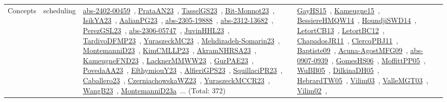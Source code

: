 {\begin{longtable}{lp{3cm}>{\raggedright\arraybackslash}p{6cm}>{\raggedright\arraybackslash}p{6cm}>{\raggedright\arraybackslash}p{8cm}}
Concepts & scheduling & \href{articles/abs-2402-00459.pdf}{abs-2402-00459}~\cite{abs-2402-00459}, \href{articles/PrataAN23.pdf}{PrataAN23}~\cite{PrataAN23}, \href{papers/TasselGS23.pdf}{TasselGS23}~\cite{TasselGS23}, \href{papers/Bit-Monnot23.pdf}{Bit-Monnot23}~\cite{Bit-Monnot23}, \href{articles/IsikYA23.pdf}{IsikYA23}~\cite{IsikYA23}, \href{papers/AalianPG23.pdf}{AalianPG23}~\cite{AalianPG23}, \href{articles/abs-2305-19888.pdf}{abs-2305-19888}~\cite{abs-2305-19888}, \href{articles/abs-2312-13682.pdf}{abs-2312-13682}~\cite{abs-2312-13682}, \href{papers/PerezGSL23.pdf}{PerezGSL23}~\cite{PerezGSL23}, \href{articles/abs-2306-05747.pdf}{abs-2306-05747}~\cite{abs-2306-05747}, \href{papers/JuvinHHL23.pdf}{JuvinHHL23}~\cite{JuvinHHL23}, \href{papers/TardivoDFMP23.pdf}{TardivoDFMP23}~\cite{TardivoDFMP23}, \href{papers/YuraszeckMC23.pdf}{YuraszeckMC23}~\cite{YuraszeckMC23}, \href{papers/Mehdizadeh-Somarin23.pdf}{Mehdizadeh-Somarin23}~\cite{Mehdizadeh-Somarin23}, \href{articles/MontemanniD23.pdf}{MontemanniD23}~\cite{MontemanniD23}, \href{papers/KimCMLLP23.pdf}{KimCMLLP23}~\cite{KimCMLLP23}, \href{articles/AkramNHRSA23.pdf}{AkramNHRSA23}~\cite{AkramNHRSA23}, \href{papers/KameugneFND23.pdf}{KameugneFND23}~\cite{KameugneFND23}, \href{articles/LacknerMMWW23.pdf}{LacknerMMWW23}~\cite{LacknerMMWW23}, \href{articles/GurPAE23.pdf}{GurPAE23}~\cite{GurPAE23}, \href{papers/PovedaAA23.pdf}{PovedaAA23}~\cite{PovedaAA23}, \href{papers/EfthymiouY23.pdf}{EfthymiouY23}~\cite{EfthymiouY23}, \href{articles/AlfieriGPS23.pdf}{AlfieriGPS23}~\cite{AlfieriGPS23}, \href{papers/SquillaciPR23.pdf}{SquillaciPR23}~\cite{SquillaciPR23}, \href{articles/Caballero23.pdf}{Caballero23}~\cite{Caballero23}, \href{articles/CzerniachowskaWZ23.pdf}{CzerniachowskaWZ23}~\cite{CzerniachowskaWZ23}, \href{articles/YuraszeckMCCR23.pdf}{YuraszeckMCCR23}~\cite{YuraszeckMCCR23}, \href{papers/WangB23.pdf}{WangB23}~\cite{WangB23}, \href{articles/MontemanniD23a.pdf}{MontemanniD23a}~\cite{MontemanniD23a}... (Total: 372) & \href{papers/GayHS15.pdf}{GayHS15}~\cite{GayHS15}, \href{articles/Kameugne15.pdf}{Kameugne15}~\cite{Kameugne15}, \href{papers/BessiereHMQW14.pdf}{BessiereHMQW14}~\cite{BessiereHMQW14}, \href{papers/HoundjiSWD14.pdf}{HoundjiSWD14}~\cite{HoundjiSWD14}, \href{papers/LetortCB13.pdf}{LetortCB13}~\cite{LetortCB13}, \href{papers/LetortBC12.pdf}{LetortBC12}~\cite{LetortBC12}, \href{papers/ChapadosJR11.pdf}{ChapadosJR11}~\cite{ChapadosJR11}, \href{papers/ClercqPBJ11.pdf}{ClercqPBJ11}~\cite{ClercqPBJ11}, \href{papers/Baptiste09.pdf}{Baptiste09}~\cite{Baptiste09}, \href{papers/Acuna-AgostMFG09.pdf}{Acuna-AgostMFG09}~\cite{Acuna-AgostMFG09}, \href{articles/abs-0907-0939.pdf}{abs-0907-0939}~\cite{abs-0907-0939}, \href{papers/GomesHS06.pdf}{GomesHS06}~\cite{GomesHS06}, \href{papers/MoffittPP05.pdf}{MoffittPP05}~\cite{MoffittPP05}, \href{papers/WuBB05.pdf}{WuBB05}~\cite{WuBB05}, \href{papers/DilkinaDH05.pdf}{DilkinaDH05}~\cite{DilkinaDH05}, \href{papers/HebrardTW05.pdf}{HebrardTW05}~\cite{HebrardTW05}, \href{papers/Vilim03.pdf}{Vilim03}~\cite{Vilim03}, \href{papers/ValleMGT03.pdf}{ValleMGT03}~\cite{ValleMGT03}, \href{papers/Vilim02.pdf}{Vilim02}~\cite{Vilim02}, 
\end{longtable}}
